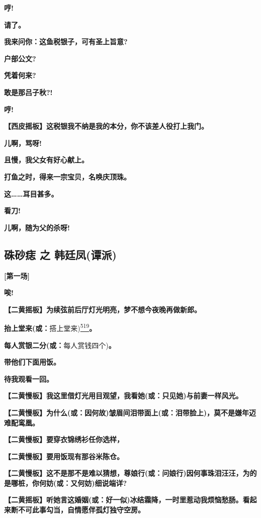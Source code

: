 \textbf{哼!}

\textbf{请了。}

\textbf{我来问你：这鱼税银子，可有圣上旨意?}

\textbf{户部公文?}

\textbf{凭着何来?}

\textbf{敢是那吕子秋?!}

\textbf{哼!}

\textbf{【西皮摇板】这税银我不纳是我的本分，你不该差人役打上我门。}

\textbf{儿啊，骂呀!}

\textbf{且慢，我父女有好心献上。}

\textbf{打鱼之时，得来一宗宝贝，名唤庆顶珠。}

\textbf{这\ldots{}\ldots{}耳目甚多。}

\textbf{看刀!}

\textbf{儿啊，随为父的杀呀!}

\hypertarget{ux7843ux7802ux75e3-ux4e4b-ux97e9ux5ef7ux51e4ux8c2dux6d3e}{%
\subsection{硃砂痣 之
韩廷凤(谭派)}\label{ux7843ux7802ux75e3-ux4e4b-ux97e9ux5ef7ux51e4ux8c2dux6d3e}}

\textbf{{[}第一场{]}}

\textbf{唉!}

\textbf{【二黄摇板】为续弦前后厅灯光明亮，梦不想今夜晚再做新郎。}

\textbf{抬上堂来(或：}搭上堂来)\protect\hyperlink{fn519}{\textsuperscript{519}}\textbf{。}

\textbf{每人赏银二分(或：}每人赏钱四个)\textbf{。}

\textbf{带他们下面用饭。}

\textbf{待我观看一回。}

\textbf{【二黄慢板】我这里借灯光用目观望，我看她(或：只见她)与前妻一样风光。}

\textbf{【二黄慢板】为什么(或：因何故)皱眉间泪带面上(或：泪带脸上)，莫不是嫌年迈难配鸾凰。}

\textbf{【二黄慢板】要穿衣锦绣衫任你选样，}

\textbf{【二黄慢板】要用饭现有那谷米陈仓。}

\textbf{【二黄慢板】这不是那不是难以猜想，尊娘行(或：问娘行)因何事珠泪汪汪，为的是哪桩，你何妨(或：又何妨)细说端详?}

\textbf{【二黄摇板】听她言这婚姻(或：好一似)冰结霜降，一时里惹动我烦恼愁肠。看起来断不可此事勾当，自情愿伴孤灯独守空房。}


